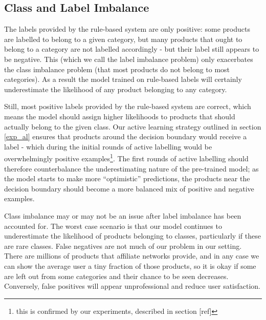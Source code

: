 \subsection{Class and Label Imbalance}
\label{label_imbalance}

The labels provided by the rule-based system are only positive:  some products are labelled to belong to a given category, but many products that ought to belong to a category are not labelled  accordingly -  but their label still appears to be negative.
This (which we call the label imbalance problem) only exacerbates the class imbalance problem (that most products do not belong to most categories).
As a result the model trained on rule-based labels will certainly underestimate the likelihood of any product belonging to any category.

Still, most positive labels provided by the rule-based system are correct, which means the model should assign higher likelihoods to products that should actually belong to the given class.
Our active learning strategy outlined in section \ref{exp_al} ensures that products around the decision boundary would receive a label - which during the initial rounds of active labelling would be overwhelmingly positive examples\footnote{this is confirmed by our experiments, described in section [ref]}.
The first rounds of active labelling should therefore counterbalance the underestimating nature of the pre-trained model; as the model starts to make more ``optimistic'' predictions, the products near the decision boundary should become a more balanced mix of positive and negative examples.

Class imbalance may or may not be an issue after label imbalance has been accounted for.
The worst case scenario is that our model continues to underestimate the likelihood of products belonging to classes, particularly if these are rare classes.
False negatives are not much of our problem in our setting.
There are millions of products that affiliate networks provide, and in any case we can show the average user a tiny fraction of those products, so it is okay if some are left out from some categories and their chance to be seen decreases.
Conversely, false positives will appear unprofessional and reduce user satisfaction.

